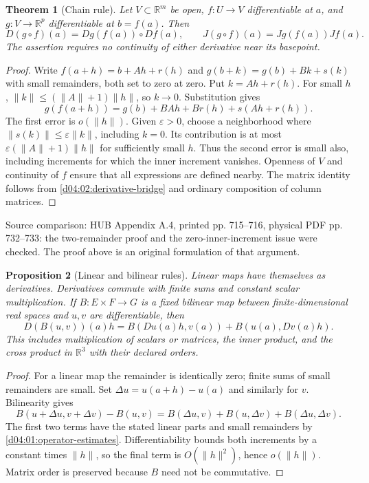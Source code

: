 \documentclass[11pt,oneside,openany]{book}
\newtheorem{theorem}{Theorem}[chapter]
\newtheorem{proposition}[theorem]{Proposition}
\theoremstyle{definition}
\theoremstyle{remark}
\newcommand{\R}{\mathbb R}
\newcommand{\eps}{\varepsilon}
\newcommand{\norm}[1]{\lVert#1\rVert}
\newcommand{\source}[1]{\par\begingroup\small\sffamily\color{black!65}Source comparison: #1\par\endgroup}
\begin{document}
\begin{theorem}[Chain rule]\label{d04:02:chain-rule}
Let $V\subset\R^m$ be open, $f:U\to V$ differentiable at $a$, and
$g:V\to\R^p$ differentiable at $b=f(a)$. Then
\[
 D(g\circ f)(a)=Dg(f(a))\circ Df(a),\qquad
 J(g\circ f)(a)=Jg(f(a))Jf(a).
\]
The assertion requires no continuity of either derivative near its basepoint.
\end{theorem}
\begin{proof}
Write $f(a+h)=b+Ah+r(h)$ and $g(b+k)=g(b)+Bk+s(k)$ with small
remainders, both set to zero at zero. Put $k=Ah+r(h)$. For small $h$,
$\norm{k}\leq(\norm{A}+1)\norm{h}$, so $k\to0$. Substitution gives
\[
 g(f(a+h))=g(b)+BAh+Br(h)+s(Ah+r(h)).
\]
The first error is $o(\norm{h})$. Given $\eps>0$, choose a neighborhood
where $\norm{s(k)}\leq\eps\norm{k}$, including $k=0$. Its contribution
is at most $\eps(\norm{A}+1)\norm{h}$ for sufficiently small $h$.
Thus the second error is small also, including increments for which the
inner increment vanishes. Openness of $V$ and continuity of $f$ ensure that
all expressions are defined nearby. The matrix identity follows from
\cref{d04:02:derivative-bridge} and ordinary composition of column matrices.
\end{proof}
\source{HUB Appendix A.4, printed pp. 715--716, physical PDF pp. 732--733:
the two-remainder proof and the zero-inner-increment issue were checked.
The proof above is an original formulation of that argument.}

\begin{proposition}[Linear and bilinear rules]\label{d04:02:bilinear-rule}
Linear maps have themselves as derivatives. Derivatives commute with finite
sums and constant scalar multiplication. If $B:E\times F\to G$ is a fixed
bilinear map between finite-dimensional real spaces and $u,v$ are
differentiable, then
\[
 D(B(u,v))(a)h=B(Du(a)h,v(a))+B(u(a),Dv(a)h).
\]
This includes multiplication of scalars or matrices, the inner product,
and the cross product in $\R^3$ with their declared orders.
\end{proposition}
\begin{proof}
For a linear map the remainder is identically zero; finite sums of small
remainders are small. Set $\Delta u=u(a+h)-u(a)$ and similarly for $v$.
Bilinearity gives
\[
 B(u+\Delta u,v+\Delta v)-B(u,v)
 =B(\Delta u,v)+B(u,\Delta v)+B(\Delta u,\Delta v).
\]
The first two terms have the stated linear parts and small remainders by
\cref{d04:01:operator-estimates}. Differentiability bounds both increments
by a constant times $\norm{h}$, so the final term is $O(\norm{h}^2)$,
hence $o(\norm{h})$. Matrix order is preserved because $B$ need not be
commutative.
\end{proof}
\end{document}
